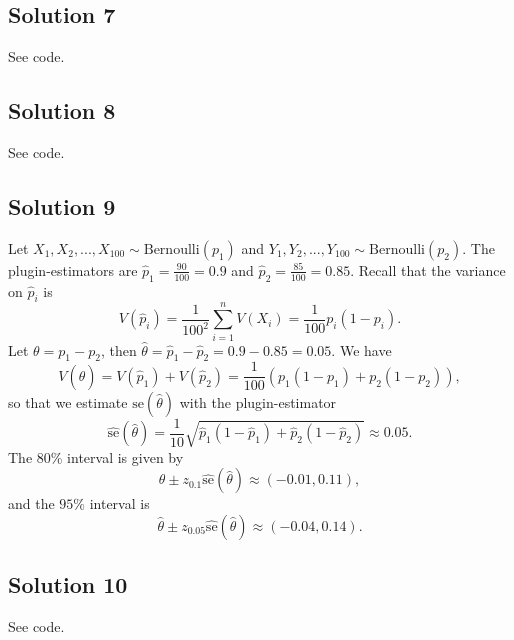 \subsection*{Solution 7}

See code.


\subsection*{Solution 8}

See code.


\subsection*{Solution 9}

Let $X_1, X_2, ..., X_{100} \sim \mathrm{Bernoulli}(p_1)$ and $Y_1, Y_2, ..., Y_{100} \sim \mathrm{Bernoulli}(p_2)$.
The plugin-estimators are $\hat{p}_1 = \frac{90}{100} = 0.9$ and $\hat{p}_2 = \frac{85}{100} = 0.85$.
Recall that the variance on $\hat{p}_i$ is
\begin{equation*}
    V(\hat{p}_i) = \frac{1}{100^2} \sum_{i = 1}^n V(X_i)
        = \frac{1}{100} p_i(1 - p_i).
\end{equation*}
Let $\theta = p_1 - p_2$, then $\hat{\theta} = \hat{p}_1 - \hat{p}_2 = 0.9 - 0.85 = 0.05$.
We have
\begin{equation*}
    V(\hat{\theta})
        = V(\hat{p}_1) + V(\hat{p}_2)
        = \frac{1}{100}(p_1(1 - p_1) + p_2(1 - p_2)),
\end{equation*}
so that we estimate $\mathrm{se}(\hat{\theta})$ with the plugin-estimator
\begin{equation*}
    \hat{\mathrm{se}}(\hat{\theta})
        = \frac{1}{10} \sqrt{\hat{p}_1(1 - \hat{p}_1) + \hat{p}_2(1 - \hat{p}_2)}
        \approx 0.05.
\end{equation*}
The $80\%$ interval is given by
\begin{equation*}
    \hat{\theta} \pm z_{0.1} \hat{\mathrm{se}}(\hat{\theta})
        \approx (-0.01, 0.11),
\end{equation*}
and the $95\%$ interval is
\begin{equation*}
    \hat{\theta} \pm z_{0.05} \hat{\mathrm{se}}(\hat{\theta})
        \approx (-0.04, 0.14).
\end{equation*}


\subsection*{Solution 10}

See code.
